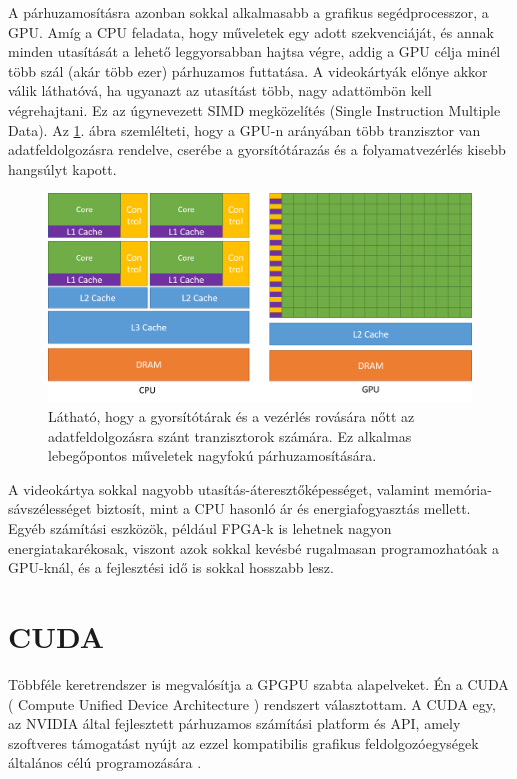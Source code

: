 A párhuzamosításra azonban sokkal alkalmasabb a grafikus segédprocesszor, a GPU. Amíg a CPU feladata, hogy műveletek egy adott szekvenciáját, és annak minden utasítását a lehető leggyorsabban hajtsa végre, addig a GPU célja minél több szál (akár több ezer) párhuzamos futtatása. A videokártyák előnye akkor válik láthatóvá, ha ugyanazt az utasítást több, nagy adattömbön kell végrehajtani. Ez az úgynevezett SIMD megközelítés (Single Instruction Multiple Data). \cite{kvantum_optim}
Az \ref{}. ábra szemlélteti, hogy a GPU-n arányában több tranzisztor van adatfeldolgozásra rendelve, cserébe a gyorsítótárazás és a folyamatvezérlés kisebb hangsúlyt kapott.

\begin{figure}[ht!]
	\centering
	\includegraphics[width=150mm, keepaspectratio] {figures/gpu-devotes-more-transistors-to-data-processing.png}
	\caption{Látható, hogy a gyorsítótárak és a vezérlés rovására nőtt az adatfeldolgozásra szánt tranzisztorok számára. Ez alkalmas lebegőpontos műveletek nagyfokú párhuzamosítására. \cite{CUDAdoc} }
\end{figure}


A videokártya sokkal nagyobb utasítás-áteresztőképességet, valamint memória-sávszélességet biztosít, mint a CPU hasonló ár és energiafogyasztás mellett. Egyéb számítási eszközök, például FPGA-k is lehetnek nagyon energiatakarékosak, viszont azok sokkal kevésbé rugalmasan programozhatóak a GPU-knál, és a fejlesztési idő is sokkal hosszabb lesz. \cite{CUDAdoc}



\section{CUDA}
Többféle keretrendszer is megvalósítja a GPGPU szabta alapelveket. Én a CUDA ( Compute Unified Device Architecture ) rendszert választottam. A CUDA egy, az NVIDIA által fejlesztett párhuzamos számítási platform és API, amely szoftveres támogatást nyújt az ezzel kompatibilis grafikus feldolgozóegységek általános célú programozására \cite{kvantum_optim}. 

